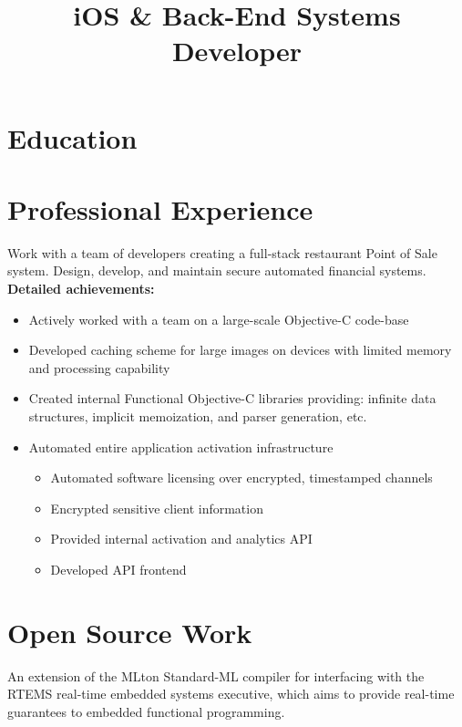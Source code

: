 \documentclass[11pt,a4paper,sans]{moderncv}   %
\title{iOS \& Back-End Systems Developer}                          %
\begin{document}
\makecvtitle

\section{Education}

\section{Professional Experience}
{Work with a team of developers creating a full-stack restaurant Point of Sale system. Design, develop, and maintain secure automated financial systems.
\newline
\textbf{Detailed achievements:}
\begin{itemize}%
\item Actively worked with a team on a large-scale Objective-C code-base
\item Developed caching scheme for large images on devices with limited memory and processing capability
\item Created internal Functional Objective-C libraries providing: infinite data structures, implicit memoization, and parser generation, etc.
\item Automated entire application activation infrastructure
  \begin{itemize}%
  \item Automated software licensing over encrypted, timestamped channels
  \item Encrypted sensitive client information
  \item Provided internal activation and analytics API
  \item Developed API frontend
  \end{itemize}
\end{itemize}}

\section{Open Source Work}
{
An extension of the MLton Standard-ML compiler for interfacing with the RTEMS real-time embedded systems executive, which aims to provide real-time guarantees to embedded functional programming.
}
\end{document}
